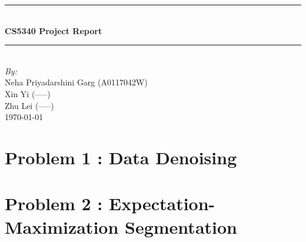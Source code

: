 \documentclass{article}
\begin{document}
\begin{titlepage}

\newcommand{\HRule}{\rule{\linewidth}{0.5mm}} %

\center %
 



\HRule \\[0.4cm]
{ \huge \bfseries CS5340 Project Report}\\[0.4cm] %
\HRule \\[1.5cm]




\Large \emph{By:}\\
Neha Priyadarshini Garg (A0117042W)\\ %
Xin Yi (-----)\\
Zhu Lei (-----)\\[3cm]


{\large \today}\\[2cm] %

\vfill %

\end{titlepage}





\section{Problem 1 : Data Denoising}

\section{Problem 2 : Expectation-Maximization Segmentation}


%
\end{document}
